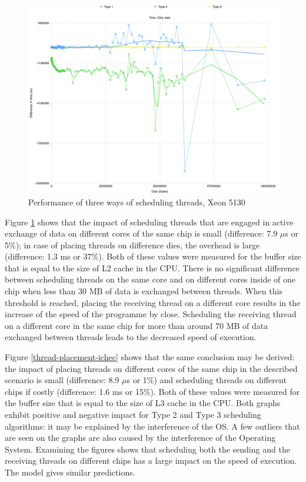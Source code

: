 \begin{figure}[ht!]
\centering
\includegraphics[width=145mm]{7/thread-placement-nuim.png}
\caption{Performance of three ways of scheduling threads, Xeon 5130}
\label{thread-placement-nuim}
\end{figure}

Figure \ref{thread-placement-nuim} shows that the impact of scheduling threads that are engaged in active exchange of data on different cores of the same chip is small (difference: 7.9 $\mu$s or 5\%); in case of placing threads on difference dies, the overhead is large (difference: 1.3 ms or 37\%). Both of these values were measured for the buffer size that is equal to the size of L2 cache in the CPU. There is no significant difference between scheduling threads on the same core and on different cores inside of one chip when less than 30 MB of data is exchanged between threads. When this threshold is reached, placing the receiving thread on a different core results in the increase of the speed of the programme by close. Scheduling the receiving thread on a different core in the same chip for more than around 70 MB of data exchanged between threads leads to the decreased speed of execution. 

Figure \ref{thread-placement-ichec} shows that the same conclusion may be derived: the impact of placing threads on different cores of the same chip in the described scenario is small (difference: 8.9 $\mu$s or 1\%) and scheduling threads on different chips if costly (difference: 1.6 ms or 15\%). Both of these values were measured for the buffer size that is equal to the size of L3 cache in the CPU. Both graphs exhibit positive and negative impact for Type 2 and Type 3 scheduling algorithms: it may be explained by the interference of the OS. A few outliers that are seen on the graphs are also caused by the interference of the Operating System. Examining the figures shows that scheduling both the sending and the receiving threads on different chips has a large impact on the speed of execution. The model gives similar predictions.

